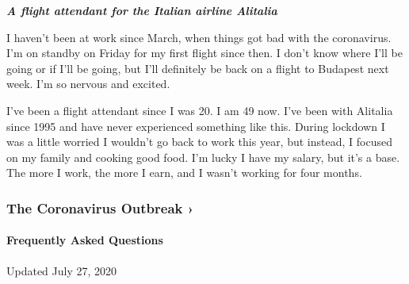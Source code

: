 \emph{\textbf{A flight attendant for the Italian airline Alitalia}}

I haven't been at work since March, when things got bad with the
coronavirus. I'm on standby on Friday for my first flight since then. I
don't know where I'll be going or if I'll be going, but I'll definitely
be back on a flight to Budapest next week. I'm so nervous and excited.

I've been a flight attendant since I was 20. I am 49 now. I've been with
Alitalia since 1995 and have never experienced something like this.
During lockdown I was a little worried I wouldn't go back to work this
year, but instead, I focused on my family and cooking good food. I'm
lucky I have my salary, but it's a base. The more I work, the more I
earn, and I wasn't working for four months.

\href{https://www.nytimes.com/news-event/coronavirus?action=click\&pgtype=Article\&state=default\&region=MAIN_CONTENT_3\&context=storylines_faq}{}

\hypertarget{the-coronavirus-outbreak-}{%
\subsubsection{The Coronavirus Outbreak
›}\label{the-coronavirus-outbreak-}}

\hypertarget{frequently-asked-questions}{%
\paragraph{Frequently Asked
Questions}\label{frequently-asked-questions}}

Updated July 27, 2020


